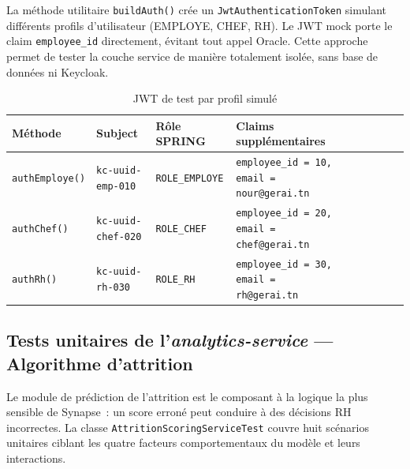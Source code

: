 La méthode utilitaire \texttt{buildAuth()} crée un \texttt{JwtAuthenticationToken}
simulant différents profils d'utilisateur (EMPLOYE, CHEF, RH). Le JWT mock porte
le claim \texttt{employee\_id} directement, évitant tout appel Oracle. Cette approche
permet de tester la couche service de manière totalement isolée, sans base de données
ni Keycloak.

\begin{table}[H]
\centering
\caption{JWT de test par profil simulé}
\label{tab:jwt_test}
\begin{tabularx}{\textwidth}{VlVlVlVLV}
\hline
\textbf{Méthode} & \textbf{Subject} & \textbf{Rôle SPRING} & \textbf{Claims supplémentaires} \\
\hline
\texttt{authEmploye()} & \texttt{kc-uuid-emp-010} & \texttt{ROLE\_EMPLOYE} & \texttt{employee\_id = 10, email = nour@gerai.tn} \\
\hline
\texttt{authChef()} & \texttt{kc-uuid-chef-020} & \texttt{ROLE\_CHEF} & \texttt{employee\_id = 20, email = chef@gerai.tn} \\
\hline
\texttt{authRh()} & \texttt{kc-uuid-rh-030} & \texttt{ROLE\_RH} & \texttt{employee\_id = 30, email = rh@gerai.tn} \\
\hline
\end{tabularx}
\end{table}


\subsection{Tests unitaires de l'\textit{analytics-service} — Algorithme d'attrition}

Le module de prédiction de l'attrition est le composant à la logique la plus
sensible de Synapse~: un score erroné peut conduire à des décisions RH incorrectes.
La classe \texttt{AttritionScoringServiceTest} couvre huit scénarios unitaires
ciblant les quatre facteurs comportementaux du modèle et leurs interactions.


